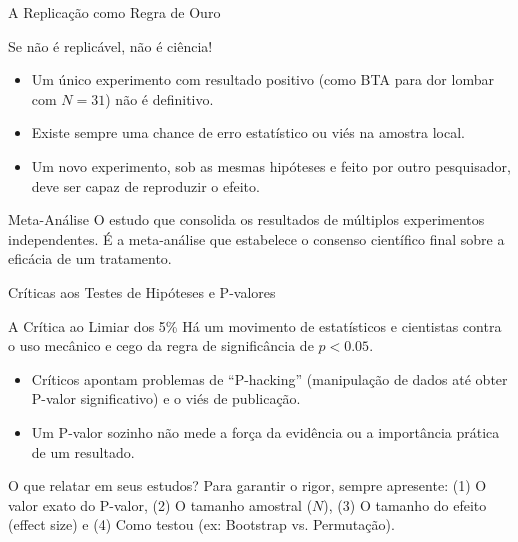 \begin{frame}{A Replicação como Regra de Ouro}
    \begin{block}{Se não é replicável, não é ciência!}
        \begin{itemize}
            \item Um único experimento com resultado positivo (como BTA para dor lombar com $N=31$) não é definitivo.
            \item Existe sempre uma chance de erro estatístico ou viés na amostra local.
            \item Um novo experimento, sob as mesmas hipóteses e feito por outro pesquisador, deve ser capaz de reproduzir o efeito.
        \end{itemize}
    \end{block}
    \begin{block}{Meta-Análise}
        O estudo que consolida os resultados de múltiplos experimentos independentes. É a meta-análise que estabelece o consenso científico final sobre a eficácia de um tratamento.
    \end{block}
\end{frame}

\begin{frame}{Críticas aos Testes de Hipóteses e P-valores}
    \begin{block}{A Crítica ao Limiar dos 5\%}
        Há um movimento de estatísticos e cientistas contra o uso mecânico e cego da regra de significância de $p < 0.05$.
        \begin{itemize}
            \item Críticos apontam problemas de ``P-hacking'' (manipulação de dados até obter P-valor significativo) e o viés de publicação.
            \item Um P-valor sozinho não mede a força da evidência ou a importância prática de um resultado.
        \end{itemize}
    \end{block}
    \begin{alertblock}{O que relatar em seus estudos?}
        Para garantir o rigor, sempre apresente: (1) O valor exato do P-valor, (2) O tamanho amostral ($N$), (3) O tamanho do efeito (effect size) e (4) Como testou (ex: Bootstrap vs. Permutação).
    \end{alertblock}
\end{frame}

